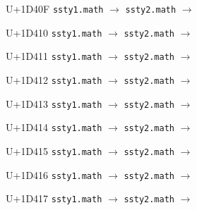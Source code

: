\documentclass{article}
\begin{document}
\begin{substitutions}
\goodbreak

U+1D40F  \linebreak
    \texttt{ssty1.math} $\to$  \linebreak
    \texttt{ssty2.math} $\to$  

\goodbreak

U+1D410  \linebreak
    \texttt{ssty1.math} $\to$  \linebreak
    \texttt{ssty2.math} $\to$  

\goodbreak

U+1D411  \linebreak
    \texttt{ssty1.math} $\to$  \linebreak
    \texttt{ssty2.math} $\to$  

\goodbreak

U+1D412  \linebreak
    \texttt{ssty1.math} $\to$  \linebreak
    \texttt{ssty2.math} $\to$  

\goodbreak

U+1D413  \linebreak
    \texttt{ssty1.math} $\to$  \linebreak
    \texttt{ssty2.math} $\to$  

\goodbreak

U+1D414  \linebreak
    \texttt{ssty1.math} $\to$  \linebreak
    \texttt{ssty2.math} $\to$  

\goodbreak

U+1D415  \linebreak
    \texttt{ssty1.math} $\to$  \linebreak
    \texttt{ssty2.math} $\to$  

\goodbreak

U+1D416  \linebreak
    \texttt{ssty1.math} $\to$  \linebreak
    \texttt{ssty2.math} $\to$  

\goodbreak

U+1D417  \linebreak
    \texttt{ssty1.math} $\to$  \linebreak
    \texttt{ssty2.math} $\to$  


\end{substitutions}
\end{document}
